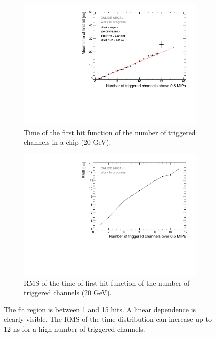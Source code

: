 \begin{figure}[t]
	\begin{subfigure}[t]{0.45\textwidth}
		\centering
		\includegraphics[width=1\textwidth]{chap5/fig_AHCAL_timing/Electrons/NumberHits_Dependance.pdf}
		\caption{Time of the first hit function of the number of triggered channels in a chip (20 GeV).}\label{fig:nhits_profile}
	\end{subfigure}
	\hfill
	\begin{subfigure}[t]{0.45\textwidth}
		\centering
		\includegraphics[width=1\textwidth]{chap5/fig_AHCAL_timing/Electrons/ParametrisationPedestalShift_20GeV.pdf}
		\caption{RMS of the time of first hit function of the number of triggered channels (20 GeV).}\label{fig:RMS_nHits}
	\end{subfigure}
	\caption{ The fit region is between 1 and 15 hits. A linear dependence is clearly visible.  The RMS of the time distribution can increase up to 12 ns for a high number of triggered channels.}
\end{figure}

